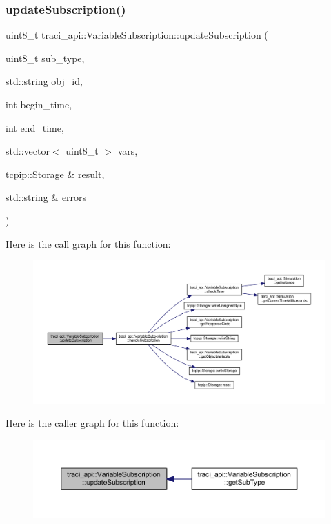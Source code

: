 \subsubsection{\texorpdfstring{update\+Subscription()}{updateSubscription()}}
{\footnotesize\ttfamily uint8\+\_\+t traci\+\_\+api\+::\+Variable\+Subscription\+::update\+Subscription (\begin{DoxyParamCaption}\item[{uint8\+\_\+t}]{sub\+\_\+type,  }\item[{std\+::string}]{obj\+\_\+id,  }\item[{int}]{begin\+\_\+time,  }\item[{int}]{end\+\_\+time,  }\item[{std\+::vector$<$ uint8\+\_\+t $>$}]{vars,  }\item[{\hyperlink{classtcpip_1_1_storage}{tcpip\+::\+Storage} \&}]{result,  }\item[{std\+::string \&}]{errors }\end{DoxyParamCaption})}

Here is the call graph for this function\+:\nopagebreak
\begin{figure}[H]
\begin{center}
\leavevmode
\includegraphics[width=350pt]{classtraci__api_1_1_variable_subscription_a4a56033c7b432c2e2d029ca5fd5c3468_cgraph}
\end{center}
\end{figure}
Here is the caller graph for this function\+:\nopagebreak
\begin{figure}[H]
\begin{center}
\leavevmode
\includegraphics[width=350pt]{classtraci__api_1_1_variable_subscription_a4a56033c7b432c2e2d029ca5fd5c3468_icgraph}
\end{center}
\end{figure}



